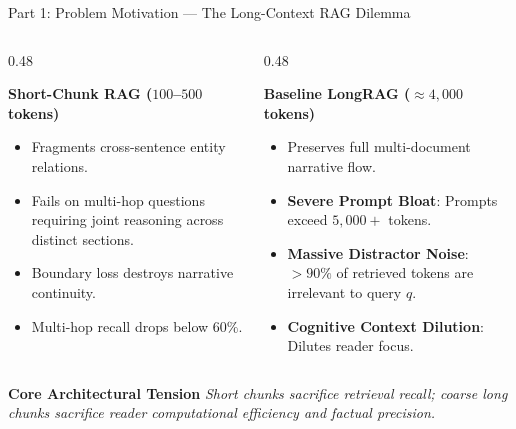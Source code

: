 \documentclass[10pt,aspectratio=169]{beamer}
\begin{document}
\begin{frame}{Part 1: Problem Motivation --- The Long-Context RAG Dilemma}
    \begin{columns}[onlytextwidth,T]
        \begin{column}{0.48\textwidth}
            \begin{block}{\textbf{Short-Chunk RAG ($100$--$500$ tokens)}}
                \begin{itemize}\setlength\itemsep{3pt}
                    \item Fragments cross-sentence entity relations.
                    \item Fails on multi-hop questions requiring joint reasoning across distinct sections.
                    \item Boundary loss destroys narrative continuity.
                    \item Multi-hop recall drops below $60\%$.
                \end{itemize}
            \end{block}
        \end{column}
        
        \begin{column}{0.48\textwidth}
            \begin{block}{\textbf{Baseline LongRAG ($\approx 4,000$ tokens)}}
                \begin{itemize}\setlength\itemsep{3pt}
                    \item Preserves full multi-document narrative flow.
                    \item \textbf{Severe Prompt Bloat}: Prompts exceed $5,000+$ tokens.
                    \item \textbf{Massive Distractor Noise}: $>90\%$ of retrieved tokens are irrelevant to query $q$.
                    \item \textbf{Cognitive Context Dilution}: Dilutes reader focus.
                \end{itemize}
            \end{block}
        \end{column}
    \end{columns}
    
    \vspace{0.2cm}
    \begin{alertblock}{\textbf{Core Architectural Tension}}
        \centering
        \textit{Short chunks sacrifice retrieval recall; coarse long chunks sacrifice reader computational efficiency and factual precision.}
    \end{alertblock}
\end{frame}
\end{document}
